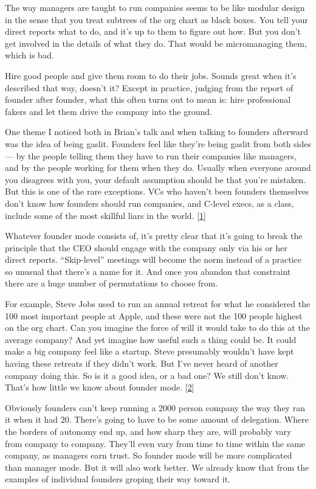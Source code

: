 The way managers are taught to run companies seems to be like modular
design in the sense that you treat subtrees of the org chart as black
boxes. You tell your direct reports what to do, and it's up to them to
figure out how. But you don't get involved in the details of what they
do. That would be micromanaging them, which is bad.

Hire good people and give them room to do their jobs. Sounds great when
it's described that way, doesn't it? Except in practice, judging from
the report of founder after founder, what this often turns out to mean
is: hire professional fakers and let them drive the company into the
ground.

One theme I noticed both in Brian's talk and when talking to founders
afterward was the idea of being gaslit. Founders feel like they're being
gaslit from both sides --- by the people telling them they have to run
their companies like managers, and by the people working for them when
they do. Usually when everyone around you disagrees with you, your
default assumption should be that you're mistaken. But this is one of
the rare exceptions. VCs who haven't been founders themselves don't know
how founders should run companies, and C-level execs, as a class,
include some of the most skillful liars in the world.
{[}\hyperref[f1n]{1}{]}

Whatever founder mode consists of, it's pretty clear that it's going to
break the principle that the CEO should engage with the company only via
his or her direct reports. ``Skip-level'' meetings will become the norm
instead of a practice so unusual that there's a name for it. And once
you abandon that constraint there are a huge number of permutations to
choose from.

For example, Steve Jobs used to run an annual retreat for what he
considered the 100 most important people at Apple, and these were not
the 100 people highest on the org chart. Can you imagine the force of
will it would take to do this at the average company? And yet imagine
how useful such a thing could be. It could make a big company feel like
a startup. Steve presumably wouldn't have kept having these retreats if
they didn't work. But I've never heard of another company doing this. So
is it a good idea, or a bad one? We still don't know. That's how little
we know about founder mode. {[}\hyperref[f2n]{2}{]}

Obviously founders can't keep running a 2000 person company the way they
ran it when it had 20. There's going to have to be some amount of
delegation. Where the borders of autonomy end up, and how sharp they
are, will probably vary from company to company. They'll even vary from
time to time within the same company, as managers earn trust. So founder
mode will be more complicated than manager mode. But it will also work
better. We already know that from the examples of individual founders
groping their way toward it.

